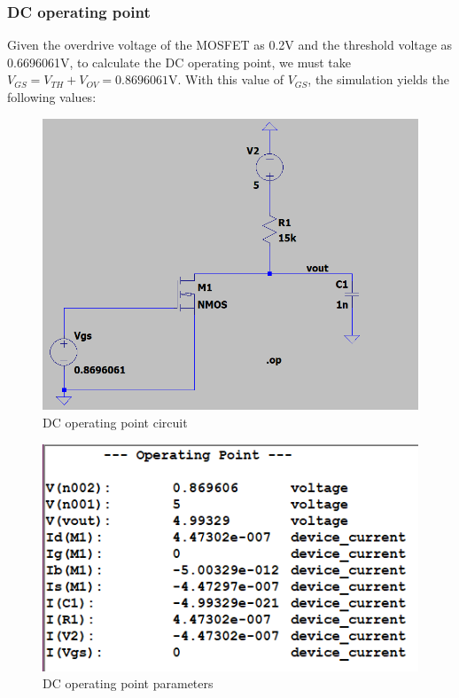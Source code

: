 \documentclass{report}[12pt]
\begin{document}
\subsubsection*{DC operating point}
Given the overdrive voltage of the MOSFET as 0.2V and the threshold voltage as 0.6696061V, to calculate the DC operating point, we must take\\
$V_{GS}=V_{TH}+V_{OV}=0.8696061$V. With this value of $V_{GS}$, the simulation yields the following values:
\begin{figure}[ht]
    \centering
    \includegraphics[scale=0.50]{resources/dcop.png}
    \caption{DC operating point circuit}
    \label{fig:dc_op}
\end{figure}
\begin{figure}[ht]
    \centering
    \includegraphics[scale=0.70]{resources/opparams.png}
    \caption{DC operating point parameters}
    \label{fig:dc_op_freq}
\end{figure}
\newpage
\end{document}
